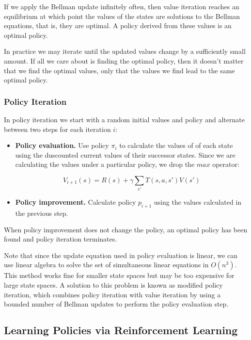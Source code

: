If we apply the Bellman update infinitely often, then value iteration reaches an equilibrium at which point the values of the states are solutions to the Bellman equations, that is, they are optimal. A policy derived from these values is an optimal policy.

In practice we may iterate until the updated values change by a sufficiently small amount. If all we care about is finding the optimal policy, then it doesn't matter that we find the optimal values, only that the values we find lead to the same optimal policy.

\subsubsection{Policy Iteration}

In policy iteration we start with a random initial values and policy and alternate between two steps for each iteration $i$:

\begin{itemize}
\item {\bf Policy evaluation.} Use policy $\pi_i$ to calculate the values of of each state using the duscounted current values of their successor states. Since we are calculating the values under a particular policy, we drop the $max$ operator:

  \begin{equation}
  V_{i+1}(s) = R(s) + \gamma \sum_{s'} T(s, a, s') V(s')
  \end{equation}

\item {\bf Policy improvement.} Calculate policy $p_{i+1}$ using the values calculated in the previous step.
\end{itemize}

When policy improvement does not change the policy, an optimal policy has been found and policy iteration terminates.

Note that since the update equation used in policy evaluation is linear, we can use linear algebra to solve the set of simultaneous linear equations in $O(n^3)$. This method works fine for smaller state spaces but may be too expensive for large state spaces. A solution to this problem is known as modified policy iteration, which combines policy iteration with value iteration by using a bounded number of Bellman updates to perform the policy evaluation step.

\subsection{Learning Policies via Reinforcement Learning}\label{sec:rl}

